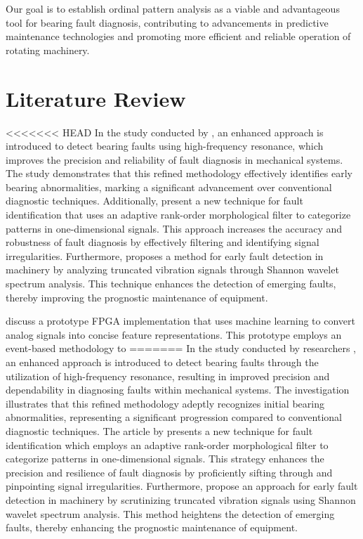 \documentclass[sn-basic,pdflatex]{sn-jnl}
\theoremstyle{remark}
\theoremstyle{definition}
\begin{document}
Our goal is to establish ordinal pattern analysis as a viable and
advantageous tool for bearing fault diagnosis, contributing to
advancements in predictive maintenance technologies and promoting more
efficient and reliable operation of rotating machinery.

\section{Literature Review}\label{sec2}

<<<<<<< HEAD
In the study conducted by \citet{WOS:000312724900101}, an enhanced
approach is introduced to detect bearing faults using high-frequency
resonance, which improves the precision and reliability of fault
diagnosis in mechanical systems. The study demonstrates that this
refined methodology effectively identifies early bearing abnormalities,
marking a significant advancement over conventional diagnostic
techniques. Additionally, \citet{WOS:000301688000008} present a new
technique for fault identification that uses an adaptive rank-order
morphological filter to categorize patterns in one-dimensional signals.
This approach increases the accuracy and robustness of fault diagnosis
by effectively filtering and identifying signal irregularities.
Furthermore, \citet{WOS:000303039300034} proposes a method for early
fault detection in machinery by analyzing truncated vibration signals
through Shannon wavelet spectrum analysis. This technique enhances the
detection of emerging faults, thereby improving the prognostic
maintenance of equipment.

\citet{WOS:000345844100102} discuss a prototype FPGA implementation that
uses machine learning to convert analog signals into concise feature
representations. This prototype employs an event-based methodology to
=======
In the study conducted by researchers \citet{WOS:000312724900101}, an
enhanced approach is introduced to detect bearing faults through the
utilization of high-frequency resonance, resulting in improved precision
and dependability in diagnosing faults within mechanical systems. The
investigation illustrates that this refined methodology adeptly
recognizes initial bearing abnormalities, representing a significant
progression compared to conventional diagnostic techniques. The article
by \citet{WOS:000301688000008} presents a new technique for fault
identification which employs an adaptive rank-order morphological filter
to categorize patterns in one-dimensional signals. This strategy
enhances the precision and resilience of fault diagnosis by proficiently
sifting through and pinpointing signal irregularities. Furthermore,
\citet{WOS:000303039300034} propose an approach for early fault
detection in machinery by scrutinizing truncated vibration signals using
Shannon wavelet spectrum analysis. This method heightens the detection
of emerging faults, thereby enhancing the prognostic maintenance of
equipment.
\end{document}
